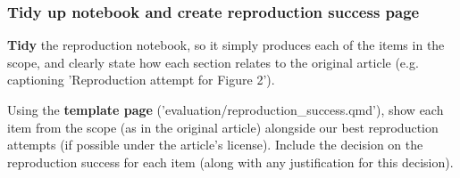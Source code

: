 \subsubsection{Tidy up notebook and create reproduction success page}

\textbf{Tidy} the reproduction notebook, so it simply produces each of the items in the scope, and clearly state how each section relates to the original article (e.g. captioning 'Reproduction attempt for Figure 2').

Using the \textbf{template page} ('evaluation/reproduction\_success.qmd'), show each item from the scope (as in the original article) alongside our best reproduction attempts (if possible under the article's license). Include the decision on the reproduction success for each item (along with any justification for this decision).
